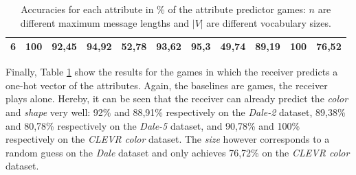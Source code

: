 \begin{table}[ht]
\begin{tabular}{cc|ccc|ccc|ccc}
        {6}                           & {100}   & {92,45}                             & {94,92}                             & {52,78}                                   & {93,62}                         & {95,3}                          & {49,74}                        & {89,19}                         & {100}                           & {76,52}                        \\
        \bottomrule
    \end{tabular}
    \caption{Accuracies for each attribute in \% of the attribute predictor games: $n$ are different maximum message lengths and $|V|$ are different vocabulary sizes.}
    \label{tab:results:attribute-predictor-game}
\end{table}

Finally, Table \ref{tab:results:attribute-predictor-game} show the results for the games in which the receiver predicts a one-hot vector of the attributes.
Again, the baselines are games, the receiver plays alone.
Hereby, it can be seen that the receiver can already predict the \emph{color} and \emph{shape} very well: 92\% and 88,91\% respectively on the \emph{Dale-2} dataset, 89,38\% and 80,78\% respectively on the \emph{Dale-5} dataset, and 90,78\% and 100\% respectively on the \emph{CLEVR color} dataset.
The \emph{size} however corresponds to a random guess on the \emph{Dale} dataset and only achieves 76,72\% on the \emph{CLEVR color} dataset.


